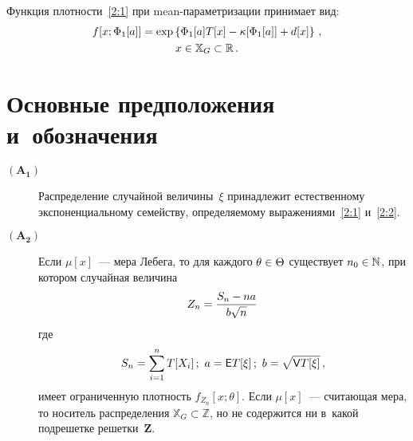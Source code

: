 \begin{multicols}{2}
   Функция плотности~\eqref{2:1} при mean-па\-ра\-мет\-ри\-за\-ции принимает вид:
 \begin{multline}
  f[x;\Phi_1[a]] =
   \exp \left\{ \Phi_1[a]  T[x]
  - \kappa[\Phi_1[a]] + d[x ]\right\}\,,
\\ x\in \mathbb {X}_G \subset \mathbb{R}\,.
 \label{2:2}
 \end{multline}


\section{Основные предположения и~обозначения}

  \begin{description}
  \item[$\mathbf{(A_1)}$] Распределение случайной величины~$\xi$
  принадлежит естественному экспоненциальному семейству, определяемому
  выражениями~\eqref{2:1} и~\eqref{2:2}.
  \item[$\mathbf{(A_2)}$]
 Если $\mu[x]$~--- мера Лебега, то для каждого $\theta\hm\in \Theta$ существует
 $n_0\hm\in \mathbb{N}$, при котором случайная величина
  $$
  Z_n=\displaystyle\frac{\displaystyle S_n-n a\mathstrut}{\displaystyle b\sqrt{n}\mathstrut}\,
  $$
  где
  $$
  S_n=\sum\limits^n_{i=1}T[X_i]\,; \ a={\sf E} T[\xi]\,;\ b=\sqrt{{\sf V} T[\xi]}\,,
  $$
 имеет ограниченную плотность $f_{Z_n}[x;\theta]$.
 Если $\mu[x]$~--- считающая мера, то носитель распределения 
 $\mathbb{X}_G\subset \mathbb{Z}$, но не содержится ни в~какой подрешетке решетки~$\mathbf{Z}$.
 \end{description}



\end{multicols}
